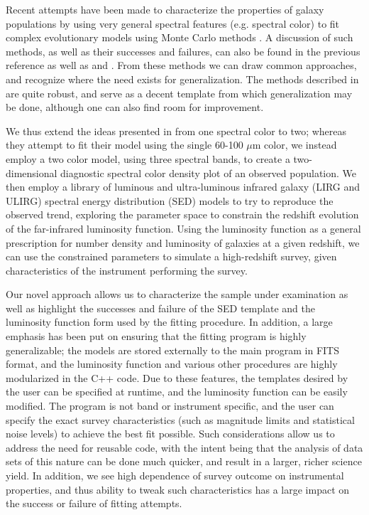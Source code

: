 \documentclass[twocolumn,letterpaper,10pt]{article}
\begin{document}
Recent attempts have been made to characterize the properties of galaxy populations by using very general spectral features (e.g. spectral color) to fit complex evolutionary models using Monte Carlo methods \citep[e.g. redshift-luminosity evolution, as in ][]{marsden11}. A discussion of such methods, as well as their successes and failures, can also be found in the previous reference as well as \citet{dunkley05} and \citep{CosmoMC}. From these methods we can draw common approaches, and recognize where the need exists for generalization. The methods described in \citet{marsden11} are quite robust, and serve as a decent template from which generalization may be done, although one can also find room for improvement.

We thus extend the ideas presented in \citet{marsden11} from one spectral color to two; whereas they attempt to fit their model using the single 60-100 $\mu$m color, we instead employ a two color model, using three spectral bands, to create a two-dimensional diagnostic spectral color density plot of an observed population. We then employ a library of luminous and ultra-luminous infrared galaxy (LIRG and ULIRG) spectral energy distribution (SED) models to try to reproduce the observed trend, exploring the parameter space to constrain the redshift evolution of the far-infrared luminosity function. Using the luminosity function as a general prescription for number density and luminosity of galaxies at a given redshift, we can use the constrained parameters to simulate a high-redshift survey, given characteristics of the instrument performing the survey.

Our novel approach allows us to characterize the sample under examination as well as highlight the successes and failure of the SED template and the luminosity function form used by the fitting procedure. In addition, a large emphasis has been put on ensuring that the fitting program is highly generalizable; the models are stored externally to the main program in FITS format, and the luminosity function and various other procedures are highly modularized in the C++ code. Due to these features, the templates desired by the user can be specified at runtime, and the luminosity function can be easily modified. The program is not band or instrument specific, and the user can specify the exact survey characteristics (such as magnitude limits and statistical noise levels) to achieve the best fit possible. Such considerations allow us to address the need for reusable code, with the intent being that the analysis of data sets of this nature can be done much quicker, and result in a larger, richer science yield. In addition, we see high dependence of survey outcome on instrumental properties, and thus ability to tweak such characteristics has a large impact on the success or failure of fitting attempts.
\end{document}
